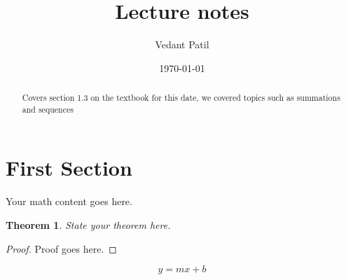 \documentclass[12pt,a4paper]{article}
\title{Lecture notes}
\author{Vedant Patil}
\date{\today}
\newtheorem{theorem}{Theorem}[section]
\begin{document}
\maketitle

\begin{abstract}
  Covers section 1.3 on the textbook for this date, we covered topics such as summations and sequences 
\end{abstract}

\tableofcontents

\section{First Section}
Your math content goes here.

\begin{theorem}
  State your theorem here.
\end{theorem}

\begin{proof}
  Proof goes here.
\end{proof}

\begin{equation}
  y = mx + b
\end{equation}



\end{document}
